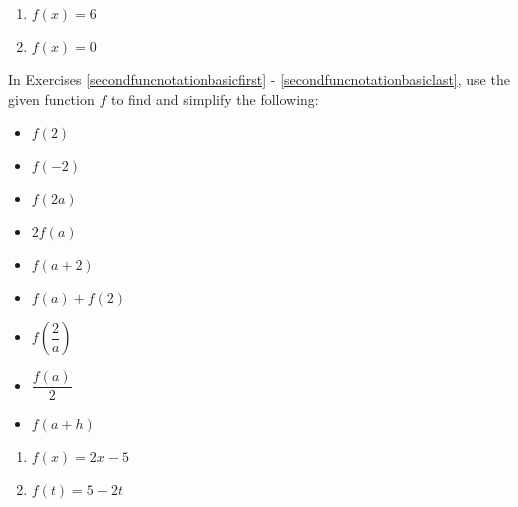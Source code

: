 \documentclass{ximera}
\begin{document}
\begin{multicols}{2}
\begin{enumerate}
\setcounter{enumi}{\value{HW}}

\item $f(x) = 6$
\item $f(x) = 0$ \label{funcnotationbasiclast}

\setcounter{HW}{\value{enumi}}
\end{enumerate}
\end{multicols}

In Exercises \ref{secondfuncnotationbasicfirst} - \ref{secondfuncnotationbasiclast}, use the given function $f$ to find and simplify the following:

\begin{multicols}{3}
\begin{itemize}

\item  $f(2)$
\item  $f(-2)$
\item  $f(2a)$

\end{itemize}
\end{multicols}

\begin{multicols}{3}
\begin{itemize}

\item  $2 f(a)$
\item $f(a+2)$
\item $f(a) + f(2)$

\end{itemize}
\end{multicols}

\begin{multicols}{3}
\begin{itemize}

\item  $f \left( \dfrac{2}{a} \right)$
\item $\dfrac{f(a)}{2}$
\item  $f(a + h)$

\end{itemize}
\end{multicols}


\begin{multicols}{2}
\begin{enumerate}
\setcounter{enumi}{\value{HW}}

\item $f(x) = 2x-5$ \label{secondfuncnotationbasicfirst}
\item $f(t) = 5-2t$

\setcounter{HW}{\value{enumi}}
\end{enumerate}
\end{multicols}
\end{document}
